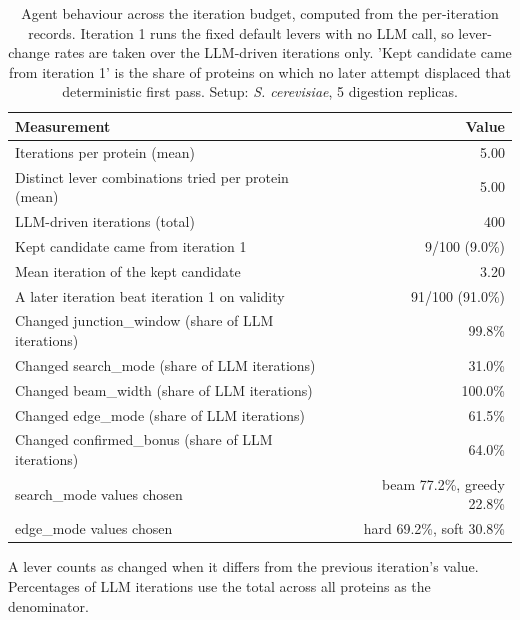 \begin{table}[!tb]
  \centering
  \caption{Agent behaviour across the iteration budget, computed from the per-iteration records. Iteration 1 runs the fixed default levers with no LLM call, so lever-change rates are taken over the LLM-driven iterations only. 'Kept candidate came from iteration 1' is the share of proteins on which no later attempt displaced that deterministic first pass. Setup: \textnormal{\textnormal{\textit{S. cerevisiae}}}, 5 digestion replicas.}
  \label{tab:agent_behaviour_yeast_r5}
  \begin{tabular}{lr}
    \toprule
    Measurement & Value \\
    \midrule
    Iterations per protein (mean) & 5.00 \\
    Distinct lever combinations tried per protein (mean) & 5.00 \\
    LLM-driven iterations (total) & 400 \\
    Kept candidate came from iteration 1 & 9/100 (9.0\%) \\
    Mean iteration of the kept candidate & 3.20 \\
    A later iteration beat iteration 1 on validity & 91/100 (91.0\%) \\
    Changed junction\_window (share of LLM iterations) & 99.8\% \\
    Changed search\_mode (share of LLM iterations) & 31.0\% \\
    Changed beam\_width (share of LLM iterations) & 100.0\% \\
    Changed edge\_mode (share of LLM iterations) & 61.5\% \\
    Changed confirmed\_bonus (share of LLM iterations) & 64.0\% \\
    search\_mode values chosen & beam 77.2\%, greedy 22.8\% \\
    edge\_mode values chosen & hard 69.2\%, soft 30.8\% \\
    \bottomrule
  \end{tabular}
  \par\smallskip\footnotesize{A lever counts as changed when it differs from the previous iteration's value. Percentages of LLM iterations use the total across all proteins as the denominator.}
\end{table}
